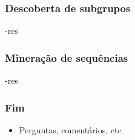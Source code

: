 \documentclass{beamer}
\begin{document}
\begin{frame}
\frametitle{Descoberta de subgrupos}
-res
\end{frame}

\begin{frame}
\frametitle{Mineração de sequências}
-res
\end{frame}

\begin{frame}
\frametitle{Fim}
\begin{itemize}
    \item Perguntas, comentários, etc 
\end{itemize}
\end{frame}
\end{document}
